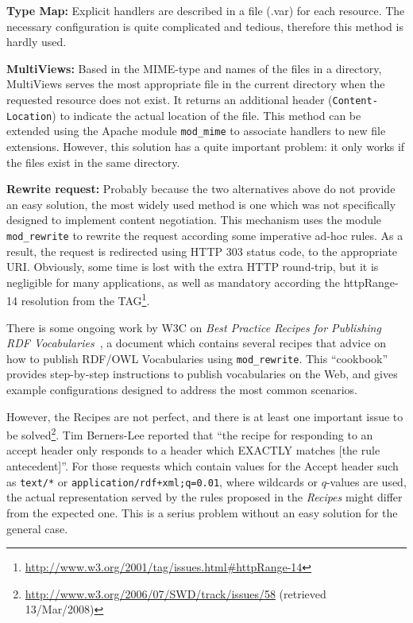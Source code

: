 \documentclass{../templates/llncs}
\begin{document}
\begin{description}

  \item \textbf{Type Map:} Explicit handlers are described in a file (.var) for 
        each resource. The necessary configuration is quite complicated and 
        tedious, therefore this method is hardly used.

  \item \textbf{MultiViews:} Based in the MIME-type and names of the files 
        in a directory, MultiViews serves the most appropriate file in the current 
        directory when the requested resource does not exist. It returns 
        an additional header (\texttt{Content-Location}) to indicate the actual 
        location of the file. This method can be extended using the Apache module \texttt{mod\_mime} 
        to associate handlers to new file extensions. However, this solution
        has a quite important problem: it only works if the files exist in
        the same directory.

  \item \textbf{Rewrite request:} Probably because the two alternatives above
        do not provide an easy solution, the most widely used method is one 
        which was not specifically designed to implement content negotiation. 
        This mechanism uses the module \texttt{mod\_rewrite} to rewrite the 
        request according some imperative ad-hoc rules. As a result, the
        request is redirected using
        HTTP 303 status code, to the appropriate URI. Obviously,  
        some time is lost with the extra HTTP round-trip, but it is negligible for
        many applications,
        as well as mandatory according the httpRange-14 resolution from the
        TAG\footnote{\url{http://www.w3.org/2001/tag/issues.html#httpRange-14}}.

\end{description}

There is some ongoing work by W3C on \textit{Best Practice Recipes for Publishing 
RDF Vocabularies}~\cite{Recipes}, a document which contains several recipes that advice on how 
to publish RDF/OWL Vocabularies using \texttt{mod\_rewrite}. This ``cookbook'' 
provides step-by-step instructions to publish vocabularies on the Web, and gives
example configurations designed to address the most common scenarios.

However, the Recipes are not perfect, and there is at least one important issue to 
be solved\footnote{\url{http://www.w3.org/2006/07/SWD/track/issues/58} (retrieved 13/Mar/2008)}.
Tim Berners-Lee reported that ``the recipe for responding to an accept 
header only responds to a header which EXACTLY matches [the rule antecedent]''.
For those requests which contain values for the Accept header such as 
\texttt{text/*} or \texttt{application/rdf+xml;q=0.01}, where wildcards or
$q$-values are used, the actual representation served by the
rules proposed in the \textit{Recipes} might differ from the expected one. This is a serius problem 
without an easy solution for the general case.
\end{document}
